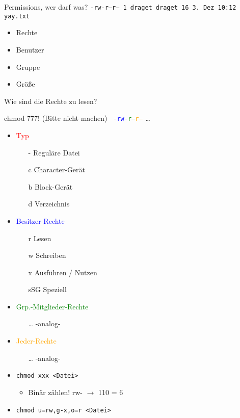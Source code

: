 \begin{frame}{Permissions, wer darf was?}
\texttt{\small -rw-r--r-- 1 draget draget 16  3. Dez 10:12 yay.txt}
\begin{itemize}
\item Rechte
\item Benutzer
\item Gruppe
\item Größe
\end{itemize}

\vspace{1cm}
Wie sind die Rechte zu lesen?
\end{frame}

\begin{frame}{chmod 777! \tiny(Bitte nicht machen)}
\texttt{\huge
\textcolor{red}{-}\textcolor{blue}{rw-}\textcolor{green}{r--}\textcolor{orange}{r--} …
}

\begin{minipage}{0.48\linewidth}
\vspace{0.5cm}
\begin{itemize}
\item \textcolor{red}{Typ}
\begin{itemize}
\item[-] Reguläre Datei
\item[c] Character-Gerät
\item[b] Block-Gerät
\item[d] Verzeichnis
\end{itemize}
\item \textcolor{blue}{Besitzer-Rechte}
\begin{itemize}
\item[r] Lesen
\item[w] Schreiben
\item[x] Ausführen / Nutzen
\item[sSG] Speziell
\end{itemize}
\end{itemize}
\end{minipage}%
\begin{minipage}{0.48\linewidth}
\vspace{0.5cm}
\begin{itemize}
\item \textcolor{green}{Grp.-Mitglieder-Rechte}
	\begin{itemize}
	\item[…] -analog-
	\end{itemize}
\item \textcolor{orange}{Jeder-Rechte}
	\begin{itemize}
	\item[…] -analog-
	\end{itemize}
\item \texttt{chmod xxx <Datei>}
	\begin{itemize}
	\item Binär zählen! rw- $\rightarrow$ 110 = 6
	\end{itemize}
\item \texttt{chmod u=rw,g-x,o=r <Datei>}
\end{itemize}
\end{minipage}

\end{frame}